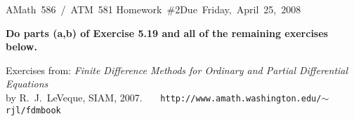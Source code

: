 \documentclass[11pt]{article}
\begin{document}


\hfill\vbox{\hbox{AMath 586 / ATM 581}
\hbox{Homework \#2}\hbox{Due Friday, April 25, 2008}}

\vskip 5pt
\noindent
{\bf Do parts (a,b) of Exercise 5.19 and all of the remaining exercises
below.}

\vskip 10pt
\noindent
Exercises from: {\it Finite Difference Methods for Ordinary and Partial 
Differential Equations}\\  by R.~J.~LeVeque, SIAM, 2007.~~~
{\tt http://www.amath.washington.edu/$\sim$rjl/fdmbook}
\vskip 10pt




\newpage





\end{document}
